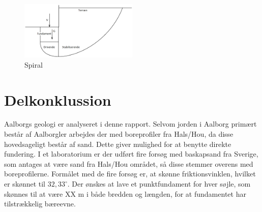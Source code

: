 \begin{figure}[htbp]
	\centering
	\includegraphics[width=0.5\textwidth]{billeder/spiral.png}
	\caption{Spiral}
	\label{fig:haha}
\end{figure}

\section{Delkonklussion}
Aalborgs geologi er analyseret i denne rapport. Selvom jorden i Aalborg primært består af Aalborgler arbejdes der med boreprofiler fra Hals/Hou, da disse hovedsageligt består af sand. Dette giver mulighed for at benytte direkte fundering. I et laboratorium er der udført fire forsøg med baskapsand fra Sverige, som antages at være sand fra Hals/Hou området, så disse stemmer overens med boreprofilerne. Formålet med de fire forsøg er, at skønne friktionsvinklen, hvilket er skønnet til $32,\!33^{\circ}$. Der ønskes at lave et punktfundament for hver søjle, som skønnes til at være XX m i både bredden og længden, for at fundamentet har tilstrækkelig bæreevne.